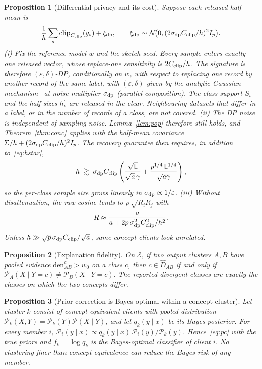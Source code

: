 \documentclass[11pt]{article}
\newtheorem{proposition}{Proposition}
\theoremstyle{definition}
\theoremstyle{remark}
\newcommand{\cP}{\mathcal{P}}
\begin{document}
\begin{proposition}[Differential privacy and its cost]\label{prop:dp}
Suppose each released half-mean is
\[
\frac1h\sum_{s}\operatorname{clip}_{C_{\rm clip}}(g_s)+\xi_{\rm dp},
\qquad
\xi_{\rm dp}\sim\mathcal N\!\big(0,(2\sigma_{\rm dp}C_{\rm clip}/h)^2I_p\big).
\]
(i) Fix the reference model $w$ and the sketch seed. Every sample enters exactly one released vector, whose replace-one sensitivity is $2C_{\rm clip}/h$. The signature is therefore $(\varepsilon,\delta)$-DP, conditionally on $w$, with respect to replacing one record by another record \emph{of the same label}, with $(\varepsilon,\delta)$ given by the analytic Gaussian mechanism~\citep{balle2018analytic} at noise multiplier $\sigma_{\rm dp}$ (parallel composition). The class support $S_i$ and the half sizes $h_i^c$ are released in the clear. Neighbouring datasets that differ in a label, or in the number of records of a class, are not covered.
(ii) The DP noise is independent of sampling noise. Lemma~\ref{lem:pop} therefore still holds, and Theorem~\ref{thm:conc} applies with the half-mean covariance $\Sigma/h+(2\sigma_{\rm dp}C_{\rm clip}/h)^2I_p$. The recovery guarantee then requires, in addition to~\eqref{eq:hstar},
\[
h\;\gtrsim\;\sigma_{\rm dp}C_{\rm clip}\left(\frac{\sqrt{\mathsf L}}{\sqrt a\,\gamma}+\frac{p^{1/4}\,\mathsf L^{1/4}}{\sqrt{a\gamma}}\right),
\]
so the per-class sample size grows linearly in $\sigma_{\rm dp}\propto1/\varepsilon$.
(iii) Without disattenuation, the raw cosine tends to $\rho\,\sqrt{R_iR_j}$ with
\[
R\approx\frac{a}{a+2p\,\sigma^2_{\rm dp}C_{\rm clip}^2/h^2}.
\]
Unless $h\gg\sqrt p\,\sigma_{\rm dp}C_{\rm clip}/\sqrt a$, same-concept clients look unrelated.
\end{proposition}

\begin{proposition}[Explanation fidelity]\label{prop:expl}
On $\mathcal E$, if two output clusters $A,B$ have pooled evidence $\mathrm{den}^c_{AB}>w_0$ on a class $c$, then $c\in\hat D_{AB}$ if and only if $\cP_A(X\mid Y=c)\neq\cP_B(X\mid Y=c)$. The reported divergent classes are exactly the classes on which the two concepts differ.
\end{proposition}

\begin{proposition}[Prior correction is Bayes-optimal within a concept cluster]\label{prop:pc}
Let cluster $k$ consist of concept-equivalent clients with pooled distribution $\cP_k(X,Y)=\cP_k(Y)\cP(X\mid Y)$, and let $q_k(y\mid x)$ be its Bayes posterior. For every member $i$, $\cP_i(y\mid x)\propto q_k(y\mid x)\,\cP_i(y)/\cP_k(y)$. Hence~\eqref{eq:pc} with the true priors and $f_k=\log q_k$ is the Bayes-optimal classifier of client $i$. No clustering finer than concept equivalence can reduce the Bayes risk of any member.
\end{proposition}
\end{document}
